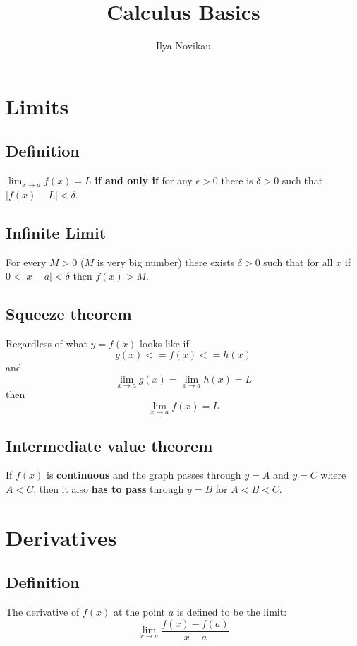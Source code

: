 \documentclass[12pt, a4paper]{scrartcl}
\author{Ilya Novikau}
\title{Calculus Basics}
\begin{document}
\maketitle

\tableofcontents

\newpage

\section{Limits}
\label{sec:limits}

\subsection{Definition}
\label{sec:limits:def}
$\lim_{x \to a}f(x) = L$ \textbf{if and only if} for any $\epsilon > 0$ there is $\delta > 0$ such that $|f(x) - L| < \delta$.

\subsection{Infinite Limit}
\label{sec:limits:inf_limit}
For every $M > 0$ ($M$ is very big number) there exists $\delta > 0$ such that for all $x$ if $0 < |x - a| < \delta$ then $f(x) > M$.

\subsection{Squeeze theorem}
\label{sec:limits:squeeze_theor}
Regardless of what $y = f(x)$ looks like if $$g(x) <= f(x) <= h(x)$$ and $$\lim_{x \to a}g(x)=\lim_{x \to a}h(x) = L$$ then $$\lim_{x \to a}f(x) = L$$

\subsection{Intermediate value theorem}
\label{sec:limits:ivt}
If $f(x)$ is \textbf{continuous} and the graph passes through $y = A$ and $y = C$ where $A < C$, then it also \textbf{has to pass} through $y = B$ for $A < B < C$.

\section{Derivatives}
\label{sec:derivatives}

\subsection{Definition}
\label{sec:derivatives:def}
The derivative of $f(x)$ at the point $a$ is defined to be the limit: $$\lim_{x \to a}\dfrac{f(x) - f(a)}{x - a}$$
\end{document}
